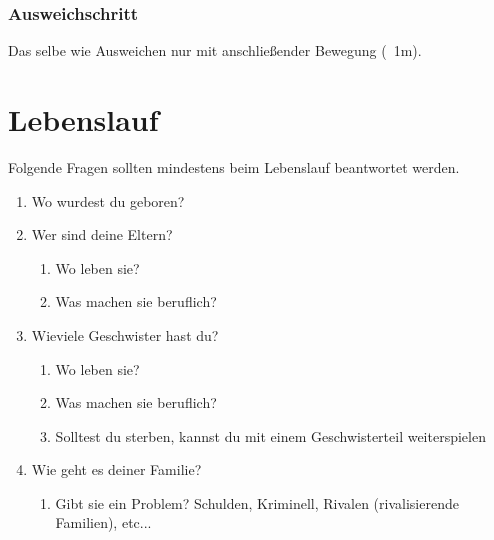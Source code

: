 \subsubsection{Ausweichschritt}
Das selbe wie Ausweichen nur mit anschließender Bewegung (~1m).


\section{Lebenslauf}
Folgende Fragen sollten mindestens beim Lebenslauf beantwortet werden.

\begin{enumerate}
\item Wo wurdest du geboren?
\item Wer sind deine Eltern?
	\begin{enumerate}[label=2.\arabic*.]
	\item Wo leben sie?
	\item Was machen sie beruflich?
	\end{enumerate}

\item Wieviele Geschwister hast du?
	\begin{enumerate}[label=3.\arabic*.]
	\item Wo leben sie?
	\item Was machen sie beruflich?
	\item Solltest du sterben, kannst du mit einem Geschwisterteil weiterspielen
	\end{enumerate}

\item Wie geht es deiner Familie?
	\begin{enumerate}[label=4.\arabic*.]
	\item Gibt sie ein Problem? Schulden, Kriminell, Rivalen (rivalisierende Familien), etc...
	\end{enumerate}

\end{enumerate}
